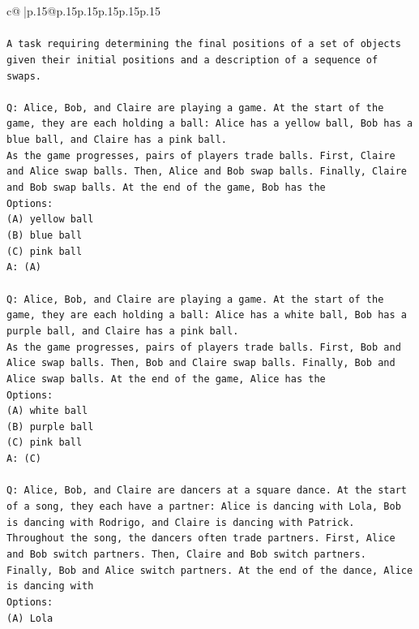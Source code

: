 \documentclass{article}
\begin{document}
{\begin{supertabular}{c@{$\;$}|p{.15\linewidth}@{}p{.15\linewidth}p{.15\linewidth}p{.15\linewidth}p{.15\linewidth}p{.15\linewidth}}
{{{\\ 
\\ 
\texttt{A task requiring determining the final positions of a set of objects given their initial positions and a description of a sequence of swaps.} \\
\\ 
\texttt{Q: Alice, Bob, and Claire are playing a game. At the start of the game, they are each holding a ball: Alice has a yellow ball, Bob has a blue ball, and Claire has a pink ball.} \\
\texttt{As the game progresses, pairs of players trade balls. First, Claire and Alice swap balls. Then, Alice and Bob swap balls. Finally, Claire and Bob swap balls. At the end of the game, Bob has the} \\
\texttt{Options:} \\
\texttt{(A) yellow ball} \\
\texttt{(B) blue ball} \\
\texttt{(C) pink ball} \\
\texttt{A: (A)} \\
\\ 
\texttt{Q: Alice, Bob, and Claire are playing a game. At the start of the game, they are each holding a ball: Alice has a white ball, Bob has a purple ball, and Claire has a pink ball.} \\
\texttt{As the game progresses, pairs of players trade balls. First, Bob and Alice swap balls. Then, Bob and Claire swap balls. Finally, Bob and Alice swap balls. At the end of the game, Alice has the} \\
\texttt{Options:} \\
\texttt{(A) white ball} \\
\texttt{(B) purple ball} \\
\texttt{(C) pink ball} \\
\texttt{A: (C)} \\
\\ 
\texttt{Q: Alice, Bob, and Claire are dancers at a square dance. At the start of a song, they each have a partner: Alice is dancing with Lola, Bob is dancing with Rodrigo, and Claire is dancing with Patrick.} \\
\texttt{Throughout the song, the dancers often trade partners. First, Alice and Bob switch partners. Then, Claire and Bob switch partners. Finally, Bob and Alice switch partners. At the end of the dance, Alice is dancing with} \\
\texttt{Options:} \\
\texttt{(A) Lola} \\
}}}
\end{supertabular}}
\end{document}
